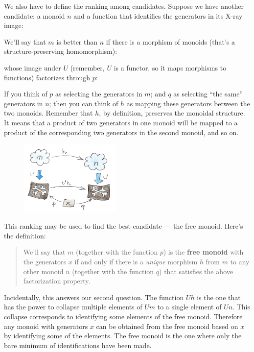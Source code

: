 \noindent
We also have to define the ranking among candidates. Suppose we have
another candidate: a monoid $n$ and a function that identifies
the generators in its X-ray image:

We'll say that $m$ is better than $n$ if there is a
morphism of monoids (that's a structure-preserving homomorphism):

whose image under $U$ (remember, $U$ is a functor, so it
maps morphisms to functions) factorizes through $p$:

If you think of $p$ as selecting the generators in $m$;
and $q$ as selecting ``the same'' generators in $n$; then
you can think of $h$ as mapping these generators between the two
monoids. Remember that $h$, by definition, preserves the monoidal
structure. It means that a product of two generators in one monoid will
be mapped to a product of the corresponding two generators in the second
monoid, and so on.

\begin{figure}[H]
\centering
\includegraphics[width=50mm]{images/monoid-ranking.jpg}
\end{figure}

\noindent
This ranking may be used to find the best candidate --- the free monoid.
Here's the definition:

\begin{quote}
We'll say that $m$ (together with the function $p$) is the
\textbf{free monoid} with the generators $x$ if and only if there
is a \emph{unique} morphism $h$ from $m$ to any other
monoid $n$ (together with the function $q$) that satisfies
the above factorization property.
\end{quote}
Incidentally, this answers our second question. The function
$U h$ is the one that has the power to collapse multiple
elements of $U m$ to a single element of $U n$. This
collapse corresponds to identifying some elements of the free monoid.
Therefore any monoid with generators $x$ can be obtained from the
free monoid based on $x$ by identifying some of the elements. The
free monoid is the one where only the bare minimum of identifications
have been made.

